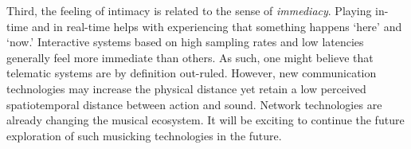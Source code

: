 Third, the feeling of intimacy is related to the sense of \emph{immediacy}. Playing in-time and in real-time helps with experiencing that something happens `here' and `now.' Interactive systems based on high sampling rates and low latencies generally feel more immediate than others. As such, one might believe that telematic systems are by definition out-ruled. However, new communication technologies may increase the physical distance yet retain a low perceived spatiotemporal distance between action and sound. Network technologies are already changing the musical ecosystem. It will be exciting to continue the future exploration of such musicking technologies in the future.
